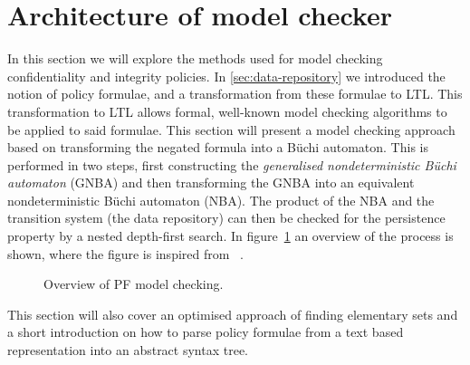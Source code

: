 \section{Architecture of model checker}
\label{sec:methods}
In this section we will explore the methods used for model checking confidentiality and integrity policies. In \ref{sec:data-repository} we introduced the notion of policy formulae, and a transformation from these formulae to LTL. This transformation to LTL allows formal, well-known model checking algorithms to be applied to said formulae. This section will present a model checking approach based on transforming the negated formula into a Büchi automaton. This is performed in two steps, first constructing the \emph{generalised nondeterministic Büchi automaton} (GNBA) and then transforming the GNBA into an equivalent nondeterministic Büchi automaton (NBA). The product of the NBA and the transition system (the data repository) can then be checked for the persistence property by a nested depth-first search. In figure~\ref{fig:model-checker} an overview of the process is shown, where the figure is inspired from ~\cite[Fig.~5.16]{baier2008principles}.

\begin{figure}[!ht]
    \centering
    
    \caption{Overview of PF model checking.}
    \label{fig:model-checker}
\end{figure}

This section will also cover an optimised approach of finding elementary sets and a short introduction on how to parse policy formulae from a text based representation into an abstract syntax tree.



